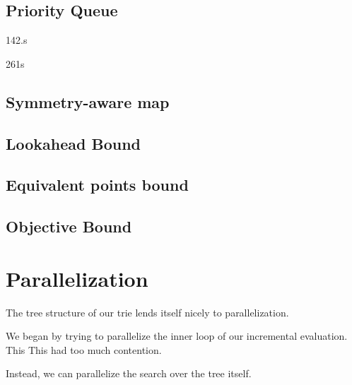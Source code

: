 \documentclass[]{report}
\theoremstyle{definition}
\begin{document}
\subsection{Priority Queue} \label{exp:priority}
142.s

261s

\subsection{Symmetry-aware map}

\subsection{Lookahead Bound}

\subsection{Equivalent points bound}

\subsection{Objective Bound}

\section{Parallelization}
The tree structure of our trie lends itself nicely to parallelization.

We began by trying to parallelize the inner loop of our incremental evaluation.
This 
This had too much contention.

Instead, we can parallelize the search over the tree itself.
\end{document}
